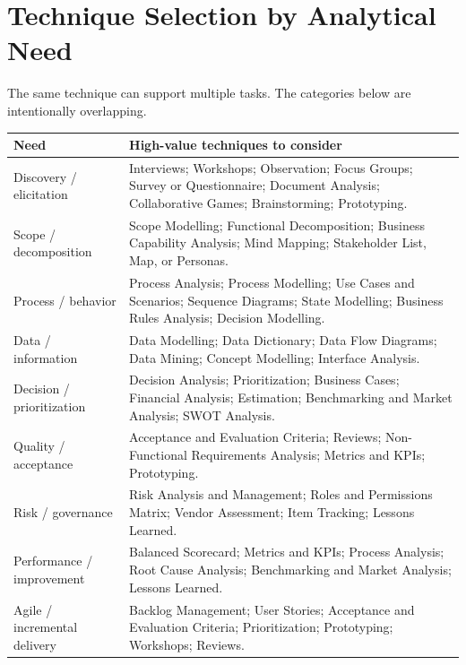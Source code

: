 \documentclass[11pt]{article}
\begin{document}
\section{Technique Selection by Analytical Need}
The same technique can support multiple tasks. The categories below are intentionally overlapping.
\begin{longtable}{L{0.23\textwidth} L{0.66\textwidth}}
\toprule
\textbf{Need} & \textbf{High-value techniques to consider}\\
\midrule
Discovery / elicitation & Interviews; Workshops; Observation; Focus Groups; Survey or Questionnaire; Document Analysis; Collaborative Games; Brainstorming; Prototyping.\\
Scope / decomposition & Scope Modelling; Functional Decomposition; Business Capability Analysis; Mind Mapping; Stakeholder List, Map, or Personas.\\
Process / behavior & Process Analysis; Process Modelling; Use Cases and Scenarios; Sequence Diagrams; State Modelling; Business Rules Analysis; Decision Modelling.\\
Data / information & Data Modelling; Data Dictionary; Data Flow Diagrams; Data Mining; Concept Modelling; Interface Analysis.\\
Decision / prioritization & Decision Analysis; Prioritization; Business Cases; Financial Analysis; Estimation; Benchmarking and Market Analysis; SWOT Analysis.\\
Quality / acceptance & Acceptance and Evaluation Criteria; Reviews; Non-Functional Requirements Analysis; Metrics and KPIs; Prototyping.\\
Risk / governance & Risk Analysis and Management; Roles and Permissions Matrix; Vendor Assessment; Item Tracking; Lessons Learned.\\
Performance / improvement & Balanced Scorecard; Metrics and KPIs; Process Analysis; Root Cause Analysis; Benchmarking and Market Analysis; Lessons Learned.\\
Agile / incremental delivery & Backlog Management; User Stories; Acceptance and Evaluation Criteria; Prioritization; Prototyping; Workshops; Reviews.\\
\bottomrule
\end{longtable}
\end{document}
